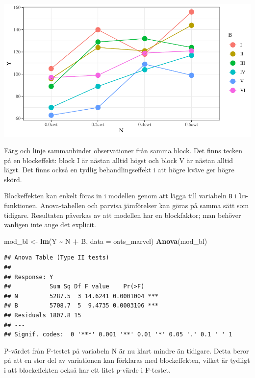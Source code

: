 \documentclass[
]{book}
\newenvironment{Shaded}{\begin{snugshade}}{\end{snugshade}}
\newcommand{\AttributeTok}[1]{\textcolor[rgb]{0.13,0.29,0.53}{#1}}
\newcommand{\FunctionTok}[1]{\textcolor[rgb]{0.13,0.29,0.53}{\textbf{#1}}}
\newcommand{\NormalTok}[1]{#1}
\newcommand{\OtherTok}[1]{\textcolor[rgb]{0.56,0.35,0.01}{#1}}
\newcommand{\SpecialCharTok}[1]{\textcolor[rgb]{0.81,0.36,0.00}{\textbf{#1}}}
\theoremstyle{definition}
\theoremstyle{definition}
\theoremstyle{definition}
\theoremstyle{definition}
\theoremstyle{remark}
\begin{document}
\begin{center}\includegraphics{R-anvisningar_files/figure-latex/unnamed-chunk-223-1} \end{center}

Färg och linje sammanbinder observationer från samma block. Det finns tecken på en blockeffekt: block I är nästan alltid högst och block V är nästan alltid lägst. Det finns också en tydlig behandlingseffekt i att högre kväve ger högre skörd.

Blockeffekten kan enkelt föras in i modellen genom att lägga till variabeln \texttt{B} i \texttt{lm}-funktionen. Anova-tabellen och parvisa jämförelser kan göras på samma sätt som tidigare. Resultaten påverkas av att modellen har en blockfaktor; man behöver vanligen inte ange det explicit.

\begin{Shaded}
\begin{Highlighting}[]
\NormalTok{mod\_bl }\OtherTok{\textless{}{-}} \FunctionTok{lm}\NormalTok{(Y }\SpecialCharTok{\textasciitilde{}}\NormalTok{ N }\SpecialCharTok{+}\NormalTok{ B, }\AttributeTok{data =}\NormalTok{ oats\_marvel)}
\FunctionTok{Anova}\NormalTok{(mod\_bl)}
\end{Highlighting}
\end{Shaded}

\begin{verbatim}
## Anova Table (Type II tests)
## 
## Response: Y
##           Sum Sq Df F value    Pr(>F)    
## N         5287.5  3 14.6241 0.0001004 ***
## B         5708.7  5  9.4735 0.0003106 ***
## Residuals 1807.8 15                      
## ---
## Signif. codes:  0 '***' 0.001 '**' 0.01 '*' 0.05 '.' 0.1 ' ' 1
\end{verbatim}

P-värdet från F-testet på variabeln N är nu klart mindre än tidigare. Detta beror på att en stor del av variationen kan förklaras med blockeffekten, vilket är tydligt i att blockeffekten också har ett litet p-värde i F-testet.
\end{document}
